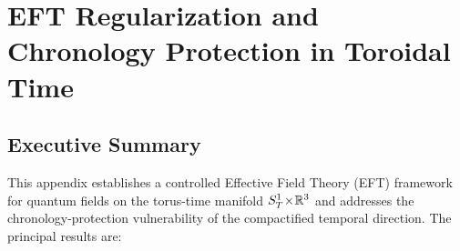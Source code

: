 \documentclass[12pt,openany]{book}
\begin{document}
\newtheorem{theoremA}{Theorem}[chapter]
\newtheorem{lemmaA}[theoremA]{Lemma}
\newtheorem{propositionA}[theoremA]{Proposition}
\newtheorem{conjectureA}[theoremA]{Conjecture}
\theoremstyle{definition}
\newtheorem{definitionA}[theoremA]{Definition}
\newtheorem{hypothesisA}[theoremA]{Hypothesis}
\theoremstyle{remark}
\newtheorem{remarkA}[theoremA]{Remark}
\newtheorem{openprobA}[theoremA]{Open Problem}

\chapter{EFT Regularization and Chronology Protection in Toroidal Time}
\label{app:EFT}

\section*{Executive Summary}
\label{sec:exec-summary}

This appendix establishes a controlled Effective Field Theory (EFT) framework
for quantum fields on the torus-time manifold $S^{1}_{T}\!\times\!\mathbb{R}^{3}$ and addresses the
chronology-protection vulnerability of the compactified temporal direction.
The principal results are:
\end{document}

